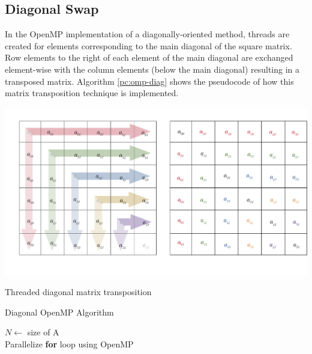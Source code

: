 \documentclass[10 pt, conference]{cssconf}
\begin{document}
\begin{multicols}{2}
\subsection{Diagonal Swap} \label{sec:diagonal_omp}
In the OpenMP implementation of a diagonally-oriented method, threads are created for elements corresponding to the main diagonal of the square matrix. Row elements to the right of each element of the main diagonal are exchanged element-wise with the column elements (below the main diagonal) resulting in a transposed matrix. Algorithm \ref{pc:omp-diag} shows the pseudocode of how this matrix transposition technique is implemented.

\vspace{-10pt}
\begin{Figure}
    \hspace{-10pt}
    {\includegraphics[width=1\linewidth]{images/diagonal-threaded.pdf}}
    \vspace{-20pt}
    \caption{Threaded diagonal matrix transposition}
    \label{fig:diagonal_transpose}
\end{Figure}%
\vspace{10pt}

\vspace{5pt}
\begin{algorithm}[H]
    \small
    \caption{Diagonal OpenMP Algorithm}\label{pc:omp-diag}
    	\SetAlgoLined
	$N \leftarrow$ size of A \\
	Parallelize \textbf{for} loop using OpenMP \\
	\vspace{6pt}
\end{algorithm}%
\vspace{5pt}


\end{multicols}
\end{document}
